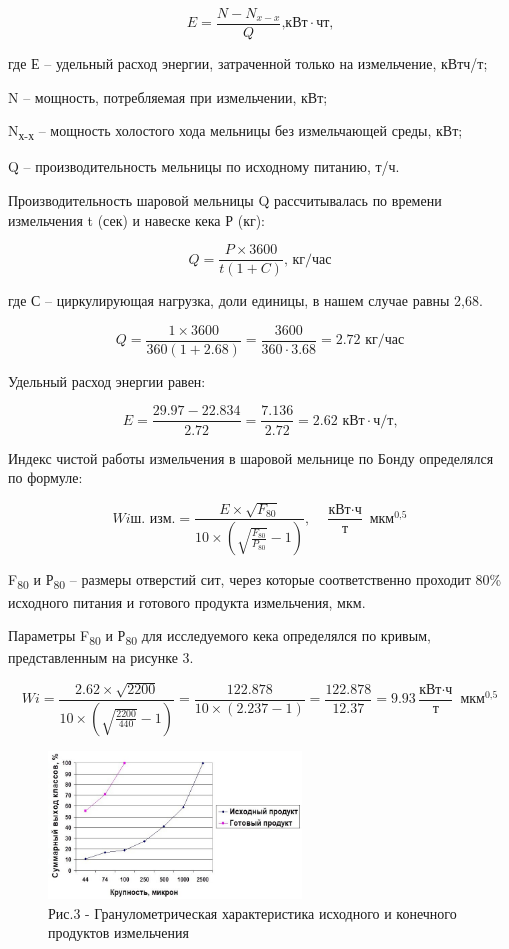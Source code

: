 \[E=\frac{N-N_{x-x}}{Q}\text{,кВт} \cdot \text{чт,}\]

где Е -- удельный расход энергии, затраченной только на измельчение,
кВтч/т;

N -- мощность, потребляемая при измельчении, кВт;

N\textsubscript{х-х} -- мощность холостого хода мельницы без
измельчающей среды, кВт;

Q -- производительность мельницы по исходному питанию, т/ч.

Производительность шаровой мельницы Q рассчитывалась по времени
измельчения t (сек) и навеске кека Р (кг):

\[ Q = \frac{P \times 3600}{t \left( 1 + C \right)} \text{, кг/час} \]

где С -- циркулирующая нагрузка, доли единицы, в нашем случае равны
2,68.

\[Q = \frac{1 \times 3600}{360 \left( 1 + 2.68 \right)} = \frac{3600}{360 \cdot 3.68} = 2.72 \text{ кг/час} \]

Удельный расход энергии равен:

\[
E = \frac{29.97 - 22.834}{2.72} = \frac{7.136}{2.72} = 2.62 \text{ кВт} \cdot \text{ч/т,}
\]

Индекс чистой работы измельчения в шаровой мельнице по Бонду определялся
по формуле:

\[
\textit{Wiш. изм.} = \frac{E \times \sqrt{F_{\text{80}}}}{10 \times \left( \sqrt{\frac{F_{\text{80}}}{P_{\text{80}}}} - 1 \right)}, \quad \frac{\text{кВт} \cdot \text{ч}}{\text{т}} \text{ мкм}^{\text{0,5}}
\]

F\textsubscript{80} и Р\textsubscript{80} -- размеры отверстий сит,
через которые соответственно проходит 80\% исходного питания и готового
продукта измельчения, мкм.

Параметры F\textsubscript{80} и Р\textsubscript{80} для исследуемого
кека определялся по кривым, представленным на рисунке 3.

\[
\textit{Wi} = \frac{2.62 \times \sqrt{2200}}{10 \times \left( \sqrt{\frac{2200}{440}} - 1 \right)} = \frac{122.878}{10 \times \left( 2.237 - 1 \right)} = \frac{122.878}{12.37} = 9.93 \frac{\text{кВт} \cdot \text{ч}}{\text{т}} \text{ мкм}^{\text{0,5}}
\]

\begin{figure}[H]
	\centering
	\includegraphics[width=0.6\textwidth]{assets/1042}
	\caption*{Рис.3 - Гранулометрическая характеристика исходного и конечного продуктов измельчения}
\end{figure}


